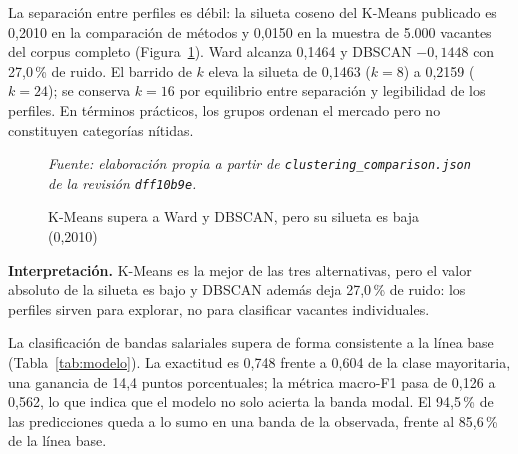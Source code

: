 \documentclass[journal]{IEEEtran}
\begin{document}
La separación entre perfiles es débil: la silueta coseno del K-Means publicado es 0,2010 en la comparación de métodos y 0,0150 en la muestra de 5.000 vacantes del corpus completo (Figura~\ref{fig:silueta}). Ward alcanza 0,1464 y DBSCAN $-0,1448$ con 27,0\,\% de ruido. El barrido de $k$ eleva la silueta de 0,1463 ($k=8$) a 0,2159 ($k=24$); se conserva $k=16$ por equilibrio entre separación y legibilidad de los perfiles. En términos prácticos, los grupos ordenan el mercado pero no constituyen categorías nítidas.

\begin{figure}[H]
\centering
{}
\caption{K-Means supera a Ward y DBSCAN, pero su silueta es baja (0,2010)}
\label{fig:silueta}
\vspace{1pt}
{\footnotesize\textit{Fuente: elaboración propia a partir de \texttt{clustering\_comparison.json} de la revisión \texttt{dff10b9e}.}}
\end{figure}

\textbf{Interpretación.} K-Means es la mejor de las tres alternativas, pero el valor absoluto de la silueta es bajo y DBSCAN además deja 27,0\,\% de ruido: los perfiles sirven para explorar, no para clasificar vacantes individuales.

La clasificación de bandas salariales supera de forma consistente a la línea base (Tabla~\ref{tab:modelo}). La exactitud es 0,748 frente a 0,604 de la clase mayoritaria, una ganancia de 14,4 puntos porcentuales; la métrica macro-F1 pasa de 0,126 a 0,562, lo que indica que el modelo no solo acierta la banda modal. El 94,5\,\% de las predicciones queda a lo sumo en una banda de la observada, frente al 85,6\,\% de la línea base.
\end{document}
